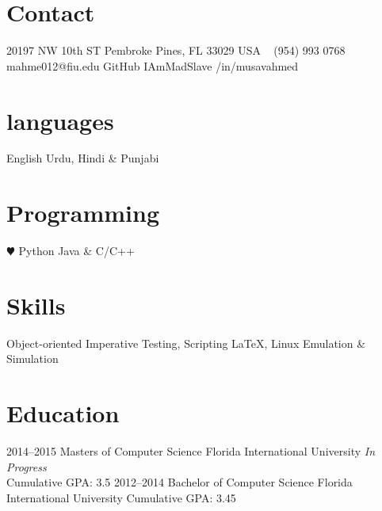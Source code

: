 \documentclass[print]{friggeri-cv} %
\begin{document}


\begin{aside} %
\section{Contact}
20197 NW 10th ST
Pembroke Pines, FL 33029 
USA
~
(954) 993 0768 
~
mahme012@fiu.edu
GitHub IAmMadSlave
/in/musavahmed
\section{languages}
English
Urdu, Hindi \& Punjabi 
\section{Programming}
{\color{red} $\varheartsuit$} Python 
Java \& C/C++ 
\section{Skills}
Object-oriented
Imperative
Testing, Scripting
LaTeX, Linux 
Emulation \& Simulation
\end{aside}


\section{Education}

\begin{entrylist}
\entry
{2014--2015}
{Masters {\normalfont of Computer Science}}
{Florida International University}
{\emph{In Progress} \\
Cumulative GPA: 3.5}
\entry
{2012--2014}
{Bachelor {\normalfont of Computer Science}}
{Florida International University}
{Cumulative GPA: 3.45}
\end{entrylist}
\end{document}
